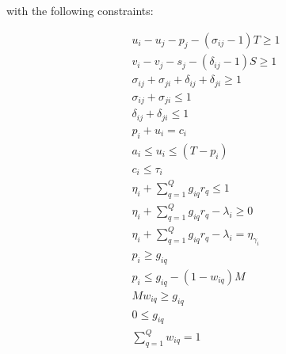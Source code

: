 \documentclass[letterpaper, 10pt, conference]{IEEEtran}
\begin{document}
with the following constraints:

\begin{subequations}
\begin{align}
    u_i - u_j - p_j - (\sigma_{ij} - 1)T \geq 1                     \label{subeq:time}         \\
    v_i - v_j - s_j - (\delta_{ij} - 1)S \geq 1                     \label{subeq:space}        \\
    \sigma_{ij} + \sigma_{ji} + \delta_{ij} + \delta_{ji} \geq 1    \label{subeq:valid_pos}    \\
    \sigma_{ij} + \sigma_{ji} \leq 1                                \label{subeq:sigma}        \\
    \delta_{ij} + \delta_{ji} \leq 1                                \label{subeq:delta}        \\
    p_i + u_i = c_i                                                 \label{subeq:detach}       \\
    a_i \leq u_i \leq (T - p_i)                                     \label{subeq:valid_starts} \\
    c_i \leq \tau_i                                                 \label{subeq:valid_depart} \\
    \eta_i + \sum_{q=1}^Q g_{iq} r_q \leq 1                         \label{subeq:max_charge}   \\
    \eta_i + \sum_{q=1}^Q g_{iq} r_q - \lambda_i \geq 0             \label{subeq:min_charge}   \\
    \eta_i + \sum_{q=1}^Q g_{iq} r_q - \lambda_i = \eta_{\gamma_i}  \label{subeq:next_charge}  \\
    p_i \geq g_{iq}                                                 \label{subeq:gpgret}       \\
    p_i \leq g_{iq} - (1 - w_{iq})M                                 \label{subeq:gpsmol}       \\
    Mw_{iq} \geq g_{iq}                                             \label{subeq:gwgret}       \\
    0 \leq g_{iq}                                                   \label{subeq:gwsmol}       \\
    \sum_{q=1}^Q w_{iq} = 1                                         \label{subeq:wmax}
\end{align}
\end{subequations}
\end{document}
